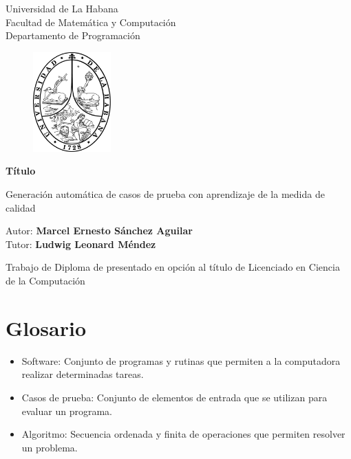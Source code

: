 \documentclass[a4paper,12pt]{book}
\begin{document}
	
	\begin{titlepage}
		\begin{center}
			\vspace*{-1in}
			Universidad de La Habana \\
			Facultad de Matemática y Computación \\
			Departamento de Programación \\
			\vspace*{0.15in}
			\begin{figure}[htb]
				\begin{center}
					\includegraphics[width=3cm]{./Graphics/uhlogo.pdf}
				\end{center}
			\end{figure}
			
			\vspace*{0.3in}
			\textbf{Título} \\
			\begin{large}
			Generación automática de casos de prueba con aprendizaje de la medida de calidad \\
			\end{large}
			\vspace*{0.6in}
			Autor: \textbf{Marcel Ernesto Sánchez Aguilar} \\
			Tutor: \textbf{Ludwig Leonard Méndez}
			
			
			\vspace*{0.6in}
			Trabajo de Diploma de presentado en opción al título de Licenciado en Ciencia de la Computación
		\end{center}
	\end{titlepage}
	
	

\chapter*{Glosario}
	\begin{itemize}
		\item Software: Conjunto de programas y rutinas que permiten a la computadora realizar determinadas tareas.
		\item Casos de prueba: Conjunto de elementos de entrada que se utilizan para evaluar un programa.
		\item Algoritmo: Secuencia ordenada y finita de operaciones que permiten resolver un problema.
	\end{itemize}
	
\end{document}
